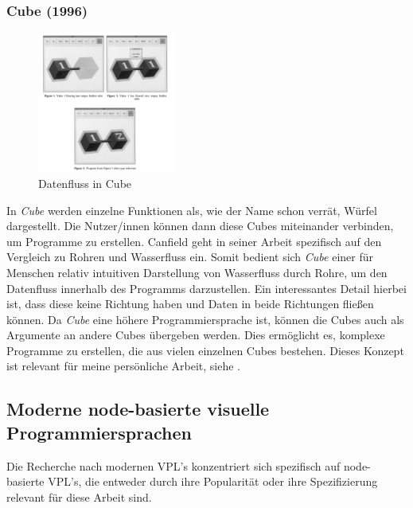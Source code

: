 \documentclass[ngerman]{article}
\begin{document}
\subsubsection{Cube (1996)}

\begingroup
\setlength\intextsep{2pt}

\begin{minipage}{\linewidth}
\begin{figure}
  \centering
  \includegraphics[width=0.4\textwidth]{./graphics/cube_vpl.png} %
  \caption{Datenfluss in Cube \cite{najork1996programming}}
  \label{fig:cube_demo}
\end{figure}
    \cite{najork1996programming}
In \textit{Cube} werden einzelne Funktionen als, wie der Name schon verrät, Würfel dargestellt. Die Nutzer/innen können dann diese Cubes miteinander verbinden, um Programme zu erstellen.
Canfield geht in seiner Arbeit spezifisch auf den Vergleich zu Rohren und Wasserfluss ein. Somit bedient sich \textit{Cube} einer für Menschen relativ intuitiven Darstellung von Wasserfluss durch Rohre, um den Datenfluss innerhalb des Programms darzustellen.
  Ein interessantes Detail hierbei ist, dass diese  keine Richtung haben und Daten in beide Richtungen fließen können. 
Da \textit{Cube} eine höhere Programmiersprache ist, können die Cubes auch als Argumente an andere Cubes übergeben werden. Dies ermöglicht es, komplexe Programme zu erstellen, die aus vielen einzelnen Cubes bestehen. 
\br
Dieses Konzept ist relevant für meine persönliche Arbeit, siehe .

\end{minipage}
\endgroup
\pagebreak

\subsection{Moderne node-basierte visuelle Programmiersprachen}
Die Recherche nach modernen VPL's konzentriert sich spezifisch auf node-basierte VPL's, die entweder durch ihre Popularität oder ihre Spezifizierung relevant für diese Arbeit sind.
\end{document}
